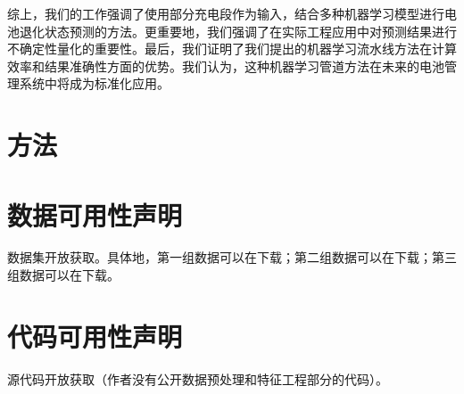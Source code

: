 \documentclass{article}
\begin{document}
综上，我们的工作强调了使用部分充电段作为输入，结合多种机器学习模型进行电池退化状态预测的方法。更重要地，我们强调了在实际工程应用中对预测结果进行不确定性量化的重要性。最后，我们证明了我们提出的机器学习流水线方法在计算效率和结果准确性方面的优势。我们认为，这种机器学习管道方法在未来的电池管理系统中将成为标准化应用。

\section{方法}

\section{数据可用性声明}

数据集开放获取。具体地，第一组数据可以在下载；第二组数据可以在下载；第三组数据可以在下载。

\section{代码可用性声明}

源代码开放获取（作者没有公开数据预处理和特征工程部分的代码）。



\end{document}
